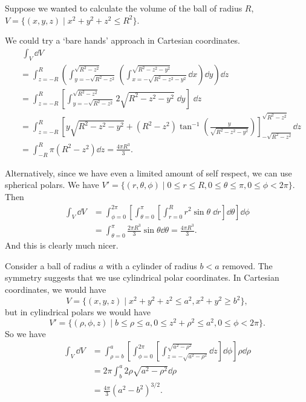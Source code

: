 \documentclass[a4paper]{scrartcl}
\begin{document}
\begin{example}
	Suppose we wanted to calculate the volume of the ball of radius $R$, $V = \{(x, y, z) \mid x^2 + y^2 + z^2 \leq R^2\}$. 
	
	We could try a `bare hands' approach in Cartesian coordinates.
	\begin{align*}
		&\ \int_V \dd V\\ &= \int_{z=-R}^{R} \left(\int_{y = - \sqrt{R^2 - z^2}}^{\sqrt{R^2 - z^2}} \left( \int_{x = - \sqrt{R^2 - z^2 - y^2}}^{\sqrt{R^2 - z^2 - y^2}} \dd x\right)\dd y\right)\dd z \\
		&=\int_{z=-R}^{R}\left[\int_{y=-\sqrt{R^{2}-z^{2}}}^{\sqrt{R^{2}-z^{2}}} 2 \sqrt{R^{2}-z^{2}-y^{2}}\; \dd y\right] \;\dd z\\
		&= \int_{z = -R}^{R}\left[y \sqrt{R^2 - z^2 - y^2} + (R^2 - z^2)\tan^{-1}\left(\frac{y}{\sqrt{R^2 - z^2 - y^2}}\right)\right]_{-\sqrt{R^2 - z^2}}^{\sqrt{R^2 - z^2}} \dd z \\
		&= \int_{-R}^R \pi (R^2 - z^2) \dd z = \frac{4 \pi R^3}{3}.
	\end{align*}

	Alternatively, since we have even a limited amount of self respect, we can use spherical polars. We have $V' = \{(r, \theta, \phi) \mid 0 \leq r \leq R, 0 \leq \theta \leq \pi, 0 \leq \phi < 2\pi\}$. Then
	\begin{align*}
		\int_V \dd V &= \int_{\phi=0}^{2 \pi}\left[\int_{\theta=0}^{\pi}\left[\int_{r=0}^{R} r^{2} \sin \theta \; \dd r\right] \dd \theta\right] \dd \phi \\
		&= \int_{\theta=0}^{\pi} \frac{2 \pi R^{3}}{3} \sin \theta \dd\theta = \frac{4 \pi R^3}{3}.
	\end{align*}
	And this is clearly much nicer.
\end{example}

\begin{example}
	Consider a ball of radius $a$ with a cylinder of radius $b < a$ removed. The symmetry suggests that we use cylindrical polar coordinates. In Cartesian coordinates, we would have
	$$
	V = \{(x, y, z) \mid x^2 + y^2 + z^2 \leq a^2, x^2 + y^2 \geq b^2 \},
	$$
	but in cylindrical polars we would have
	$$
	V' = \{(\rho, \phi, z) \mid b \leq \rho \leq a, 0 \leq z^2 + \rho^2 \leq a^2, 0 \leq \phi < 2 \pi\}.
	$$
	So we have
	\begin{align*}
		\int_V \dd V &= \int_{\rho=b}^a \left[\int_{\phi = 0}^{2\pi}\left[\int_{z = -\sqrt{a^2 - \rho^2}}^{\sqrt{a^2 - \rho^2}}\dd z\right]\dd \phi\right]\rho \dd \rho \\
		&= 2 \pi \int_{b}^a 2\rho\sqrt{a^2 - \rho^2} \dd \rho \\
		&= \frac{4 \pi}{3}(a^2 - b^2)^{3/2}.
	\end{align*}
\end{example}
\end{document}
